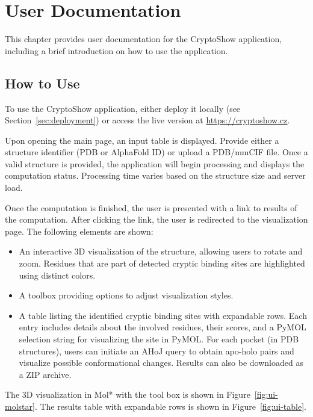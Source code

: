 \chapter{User Documentation}
\label{chap:user-documentation}

This chapter provides user documentation for the CryptoShow application, including a brief introduction on how to use the application.

\section{How to Use}
\label{sec:how-to-use}

To use the CryptoShow application, either deploy it locally (see Section~\ref{sec:deployment}) or access the live version at \url{https://cryptoshow.cz}.

Upon opening the main page, an input table is displayed. Provide either a structure identifier (PDB or AlphaFold ID) or upload a PDB/mmCIF file. Once a valid structure is provided, the application will begin processing and displays the computation status. Processing time varies based on the structure size and server load.

Once the computation is finished, the user is presented with a link to results of the computation. After clicking the link, the user is redirected to the visualization page. The following elements are shown:

\begin{itemize}
    \item An interactive 3D visualization of the structure, allowing users to rotate and zoom. Residues that are part of detected cryptic binding sites are highlighted using distinct colors.
    \item A toolbox providing options to adjust visualization styles.
    \item A table listing the identified cryptic binding sites with expandable rows. Each entry includes details about the involved residues, their scores, and a PyMOL selection string for visualizing the site in PyMOL. For each pocket (in PDB structures), users can initiate an AHoJ query to obtain apo-holo pairs and visualize possible conformational changes. Results can also be downloaded as a ZIP archive.
\end{itemize}

The 3D visualization in Mol* with the tool box is shown in Figure~\ref{fig:ui-molstar}. The results table with expandable rows is shown in Figure~\ref{fig:ui-table}.

